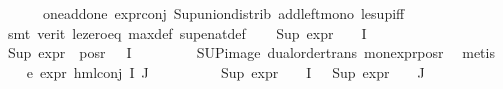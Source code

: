 \begin{isabellebody}
\ \ \ \ \ \ one{\isacharunderscore}{\kern0pt}add{\isacharunderscore}{\kern0pt}one\ expr{\isacharunderscore}{\kern0pt}{}{\isacharunderscore}{\kern0pt}conj\ Sup{\isacharunderscore}{\kern0pt}union{\isacharunderscore}{\kern0pt}distrib\ add{\isacharunderscore}{\kern0pt}left{\isacharunderscore}{\kern0pt}mono\ le{\isacharunderscore}{\kern0pt}sup{\isacharunderscore}{\kern0pt}iff\isanewline
\ \ \ \ \isamarkupfalse%
\ {\isacharparenleft}{\kern0pt}smt\ {\isacharparenleft}{\kern0pt}verit{\isacharparenright}{\kern0pt}\ le{\isacharunderscore}{\kern0pt}zero{\isacharunderscore}{\kern0pt}eq\ max{\isacharunderscore}{\kern0pt}def\ sup{\isacharunderscore}{\kern0pt}enat{\isacharunderscore}{\kern0pt}def{\isacharparenright}{\kern0pt}\isanewline
\ \ \isamarkupfalse%
\ {\isacartoucheopen}Sup\ {\isacharparenleft}{\kern0pt}{\isacharparenleft}{\kern0pt}expr{\isacharunderscore}{\kern0pt}{}\ {\isasymcirc}\ {\isasymPhi}{\isacharparenright}{\kern0pt}\ {\isacharbackquote}{\kern0pt}\ I{\isacharparenright}{\kern0pt}\ {\isasymle}\ {}{\isacartoucheclose}\ \isamarkupfalse%
\ {\isachardoublequoteopen}Sup\ {\isacharparenleft}{\kern0pt}expr{\isacharunderscore}{\kern0pt}{}\ {\isacharbackquote}{\kern0pt}\ {\isacharparenleft}{\kern0pt}pos{\isacharunderscore}{\kern0pt}r\ {\isacharparenleft}{\kern0pt}{\isasymPhi}\ {\isacharbackquote}{\kern0pt}\ I{\isacharparenright}{\kern0pt}{\isacharparenright}{\kern0pt}{\isacharparenright}{\kern0pt}\ {\isacharless}{\kern0pt}{\isacharequal}{\kern0pt}\ {}{\isachardoublequoteclose}\ \isanewline
\ \ \ \ \isamarkupfalse%
\ SUP{\isacharunderscore}{\kern0pt}image\ dual{\isacharunderscore}{\kern0pt}order{\isachardot}{\kern0pt}trans\ mon{\isacharunderscore}{\kern0pt}expr{\isacharunderscore}{\kern0pt}{}{\isacharunderscore}{\kern0pt}pos{\isacharunderscore}{\kern0pt}r\ \isamarkupfalse%
\ metis\isanewline
\ \ \isamarkupfalse%
\ e{}{\isacharcolon}{\kern0pt}\ {\isachardoublequoteopen}expr{\isacharunderscore}{\kern0pt}{}\ {\isacharparenleft}{\kern0pt}hml{\isacharunderscore}{\kern0pt}conj\ I\ J\ {\isasymPhi}{\isacharparenright}{\kern0pt}\ {\isasymle}\ {}{\isachardoublequoteclose}\ \isanewline
\ \ \ \ \isamarkupfalse%
\ {\isacartoucheopen}Sup\ {\isacharparenleft}{\kern0pt}{\isacharparenleft}{\kern0pt}expr{\isacharunderscore}{\kern0pt}{}\ {\isasymcirc}\ {\isasymPhi}{\isacharparenright}{\kern0pt}\ {\isacharbackquote}{\kern0pt}\ I{\isacharparenright}{\kern0pt}\ {\isasymle}\ {}{\isacartoucheclose}\ {\isacartoucheopen}Sup\ {\isacharparenleft}{\kern0pt}{\isacharparenleft}{\kern0pt}expr{\isacharunderscore}{\kern0pt}{}\ {\isasymcirc}\ {\isasymPhi}{\isacharparenright}{\kern0pt}\ {\isacharbackquote}{\kern0pt}\ J{\isacharparenright}{\kern0pt}\ {\isasymle}\ {}{\isacartoucheclose}\isanewline

\end{isabellebody}

